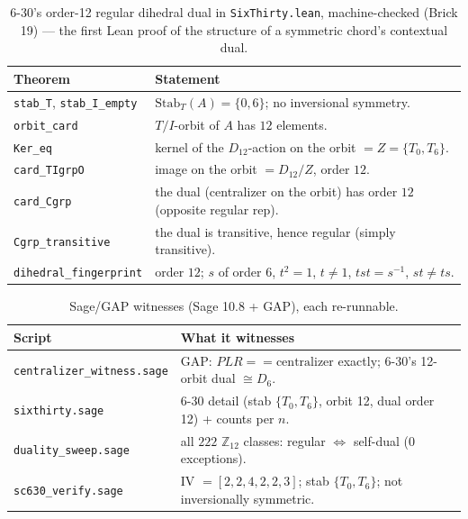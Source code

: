 \documentclass[11pt]{article}
\newcommand{\lean}[1]{\texttt{#1}}
\newcommand{\Ztwelve}{\mathbb{Z}_{12}}
\newcommand{\Dgrp}[1]{D_{#1}}
\newcommand{\Stab}{\mathrm{Stab}}
\begin{document}
\begin{table}[h]
\centering\small
{}
\begin{tabular}{@{}l p{}@{}}
\toprule
\rowcolor{ctA!22}
\textbf{Theorem} & \textbf{Statement}\\
\midrule
\lean{stab\_T}, \lean{stab\_I\_empty} & $\Stab_T(A)=\{0,6\}$; no inversional symmetry.\\
\lean{orbit\_card}                    & $T/I$-orbit of $A$ has $12$ elements.\\
\lean{Ker\_eq}                        & kernel of the $\Dgrp{12}$-action on the orbit $=Z=\{T_0,T_6\}$.\\
\lean{card\_TIgrpO}                   & image on the orbit $=\Dgrp{12}/Z$, order $12$.\\
\lean{card\_Cgrp}                     & the dual (centralizer on the orbit) has order $12$ (opposite regular rep).\\
\lean{Cgrp\_transitive}              & the dual is transitive, hence regular (simply transitive).\\
\lean{dihedral\_fingerprint}          & order $12$; $s$ of order $6$, $t^2=1$, $t\ne1$, $tst=s^{-1}$, $st\ne ts$.\\
\bottomrule
\end{tabular}
\caption{6-30's order-12 regular dihedral dual in \lean{SixThirty.lean}, machine-checked (Brick 19) ---
the first Lean proof of the structure of a symmetric chord's contextual dual.}
\label{tab:s30}
\end{table}

\begin{table}[h]
\centering\small
{}
\begin{tabular}{@{}l p{}@{}}
\toprule
\rowcolor{ctA!22}
\textbf{Script} & \textbf{What it witnesses}\\
\midrule
\lean{centralizer\_witness.sage} & GAP: $PLR==\mathrm{centralizer}$ exactly; 6-30's 12-orbit dual $\cong\Dgrp{6}$.\\
\lean{sixthirty.sage}            & 6-30 detail (stab $\{T_0,T_6\}$, orbit 12, dual order 12) + counts per $n$.\\
\lean{duality\_sweep.sage}       & all $222$ $\Ztwelve$ classes: regular $\iff$ self-dual (0 exceptions).\\
\lean{sc630\_verify.sage}        & IV $=[2,2,4,2,2,3]$; stab $\{T_0,T_6\}$; not inversionally symmetric.\\
\bottomrule
\end{tabular}
\caption{Sage/GAP witnesses (Sage 10.8 + GAP), each re-runnable.}
\label{tab:sage}
\end{table}
\end{document}
